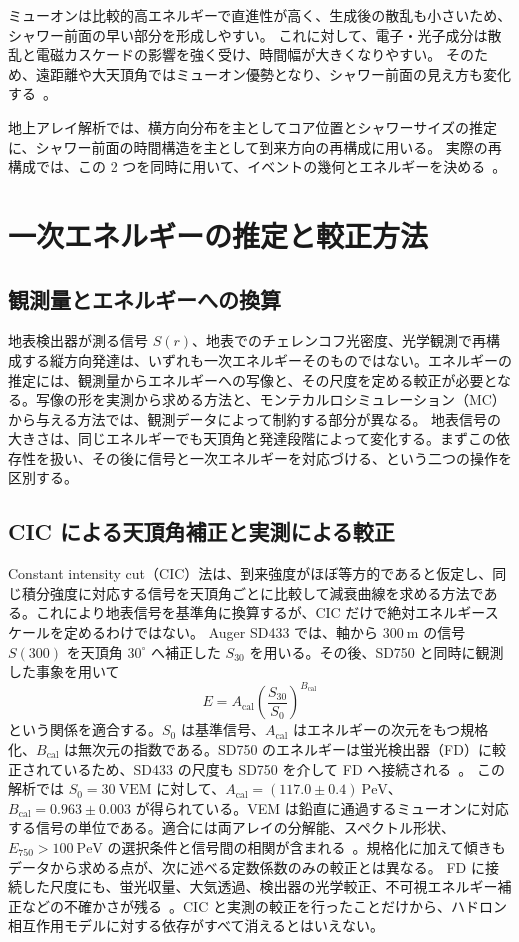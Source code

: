 \documentclass[book,paper=a4,fontsize=11pt]{jlreq}
\begin{document}
ミューオンは比較的高エネルギーで直進性が高く、生成後の散乱も小さいため、シャワー前面の早い部分を形成しやすい。
これに対して、電子・光子成分は散乱と電磁カスケードの影響を強く受け、時間幅が大きくなりやすい。
そのため、遠距離や大天頂角ではミューオン優勢となり、シャワー前面の見え方も変化する~\cite{Cazon2004}。

地上アレイ解析では、横方向分布を主としてコア位置とシャワーサイズの推定に、シャワー前面の時間構造を主として到来方向の再構成に用いる。
実際の再構成では、この 2 つを同時に用いて、イベントの幾何とエネルギーを決める~\cite{Takeda2003}。

\section{一次エネルギーの推定と較正方法}\label{sec:energy_calibration}
\subsection{観測量とエネルギーへの換算}
地表検出器が測る信号 \(S(r)\)、地表でのチェレンコフ光密度、光学観測で再構成する縦方向発達は、いずれも一次エネルギーそのものではない。エネルギーの推定には、観測量からエネルギーへの写像と、その尺度を定める較正が必要となる。写像の形を実測から求める方法と、モンテカルロシミュレーション（MC）から与える方法では、観測データによって制約する部分が異なる。
地表信号の大きさは、同じエネルギーでも天頂角と発達段階によって変化する。まずこの依存性を扱い、その後に信号と一次エネルギーを対応づける、という二つの操作を区別する。

\subsection{CIC による天頂角補正と実測による較正}
Constant intensity cut（CIC）法は、到来強度がほぼ等方的であると仮定し、同じ積分強度に対応する信号を天頂角ごとに比較して減衰曲線を求める方法である。これにより地表信号を基準角に換算するが、CIC だけで絶対エネルギースケールを定めるわけではない。
Auger SD433 では、軸から \(300\ \mathrm m\) の信号 \(S(300)\) を天頂角 \(30^\circ\) へ補正した \(S_{30}\) を用いる。その後、SD750 と同時に観測した事象を用いて
\begin{equation}
  E=A_{\mathrm{cal}}\left(\frac{S_{30}}{S_0}\right)^{B_{\mathrm{cal}}}
  \label{eq:measured_energy_calibration}
\end{equation}
という関係を適合する。\(S_0\) は基準信号、\(A_{\mathrm{cal}}\) はエネルギーの次元をもつ規格化、\(B_{\mathrm{cal}}\) は無次元の指数である。SD750 のエネルギーは蛍光検出器（FD）に較正されているため、SD433 の尺度も SD750 を介して FD へ接続される~\cite{AugerSD4332023}。
この解析では \(S_0=30\ \mathrm{VEM}\) に対して、\(A_{\mathrm{cal}}=(117.0\pm0.4)\ \mathrm{PeV}\)、\(B_{\mathrm{cal}}=0.963\pm0.003\) が得られている。VEM は鉛直に通過するミューオンに対応する信号の単位である。適合には両アレイの分解能、スペクトル形状、\(E_{750}>100\ \mathrm{PeV}\) の選択条件と信号間の相関が含まれる~\cite{AugerSD4332023}。規格化に加えて傾きもデータから求める点が、次に述べる定数係数のみの較正とは異なる。
FD に接続した尺度にも、蛍光収量、大気透過、検出器の光学較正、不可視エネルギー補正などの不確かさが残る~\cite{AugerSecondKnee2021}。CIC と実測の較正を行ったことだけから、ハドロン相互作用モデルに対する依存がすべて消えるとはいえない。
\end{document}

